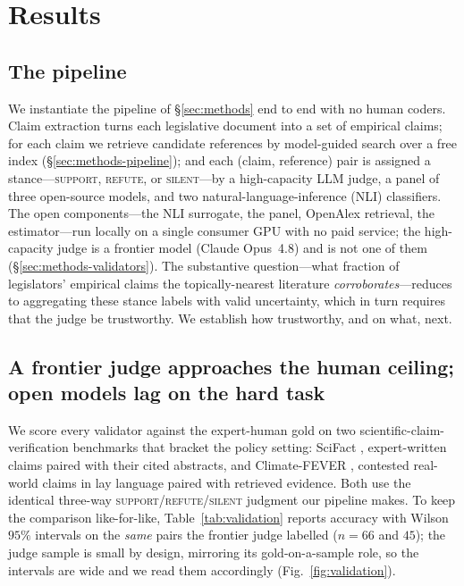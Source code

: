 \section{Results}
\label{sec:results}

\subsection{The pipeline}
We instantiate the pipeline of \S\ref{sec:methods} end to end with no human coders. Claim extraction
turns each legislative document into a set of empirical claims; for each claim we retrieve candidate
references by model-guided search over a free index (\S\ref{sec:methods-pipeline}); and each (claim,
reference) pair is assigned a stance---\textsc{support}, \textsc{refute}, or \textsc{silent}---by a
high-capacity LLM judge, a panel of three open-source models, and two natural-language-inference (NLI)
classifiers. The open components---the NLI surrogate, the panel, OpenAlex retrieval, the
estimator---run locally on a single consumer GPU with no paid service; the high-capacity judge is a
frontier model (Claude Opus~4.8) and is not one of them (\S\ref{sec:methods-validators}). The
substantive question---what fraction of legislators' empirical claims the topically-nearest literature
\emph{corroborates}---reduces to aggregating these stance labels with valid uncertainty, which in turn
requires that the judge be trustworthy. We establish how trustworthy, and on what, next.

\subsection{A frontier judge approaches the human ceiling; open models lag on the hard task}
\label{sec:res-validation}
We score every validator against the expert-human gold on two scientific-claim-verification benchmarks
that bracket the policy setting: SciFact \citep{wadden2020fact}, expert-written claims paired with their
cited abstracts, and Climate-FEVER \citep{diggelmann2020climate}, contested real-world claims in lay
language paired with retrieved evidence. Both use the identical three-way
\textsc{support}/\textsc{refute}/\textsc{silent} judgment our pipeline makes. To keep the comparison
like-for-like, Table~\ref{tab:validation} reports accuracy with Wilson $95\%$ intervals on the
\emph{same} pairs the frontier judge labelled ($n=66$ and $45$); the judge sample is small by design,
mirroring its gold-on-a-sample role, so the intervals are wide and we read them accordingly
(Fig.~\ref{fig:validation}).

